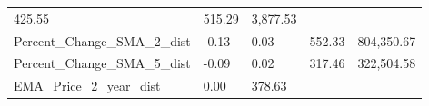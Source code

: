 \documentclass[]{article}
\begin{document}
\begin{longtable}[]{@{}lllll@{}}
\begin{minipage}[t]{0.09\columnwidth}
425.55\strut
\end{minipage} & \begin{minipage}[t]{0.09\columnwidth}\raggedright\strut
515.29\strut
\end{minipage} & \begin{minipage}[t]{0.11\columnwidth}\raggedright\strut
3,877.53\strut
\end{minipage}\tabularnewline
\begin{minipage}[t]{0.49\columnwidth}\raggedright\strut
Percent\_Change\_SMA\_2\_dist\strut
\end{minipage} & \begin{minipage}[t]{0.08\columnwidth}\raggedright\strut
-0.13\strut
\end{minipage} & \begin{minipage}[t]{0.09\columnwidth}\raggedright\strut
0.03\strut
\end{minipage} & \begin{minipage}[t]{0.09\columnwidth}\raggedright\strut
552.33\strut
\end{minipage} & \begin{minipage}[t]{0.11\columnwidth}\raggedright\strut
804,350.67\strut
\end{minipage}\tabularnewline
\begin{minipage}[t]{0.49\columnwidth}\raggedright\strut
Percent\_Change\_SMA\_5\_dist\strut
\end{minipage} & \begin{minipage}[t]{0.08\columnwidth}\raggedright\strut
-0.09\strut
\end{minipage} & \begin{minipage}[t]{0.09\columnwidth}\raggedright\strut
0.02\strut
\end{minipage} & \begin{minipage}[t]{0.09\columnwidth}\raggedright\strut
317.46\strut
\end{minipage} & \begin{minipage}[t]{0.11\columnwidth}\raggedright\strut
322,504.58\strut
\end{minipage}\tabularnewline
\begin{minipage}[t]{0.49\columnwidth}\raggedright\strut
EMA\_Price\_2\_year\_dist\strut
\end{minipage} & \begin{minipage}[t]{0.08\columnwidth}\raggedright\strut
0.00\strut
\end{minipage} & \begin{minipage}[t]{0.09\columnwidth}\raggedright\strut
378.63\strut

\end{minipage}
\end{longtable}
\end{document}
